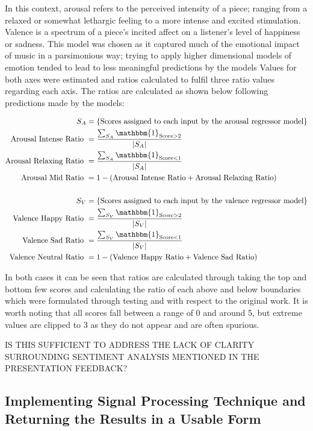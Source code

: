 \documentclass[12pt,]{article}
\begin{document}
In this context, arousal refers to the perceived intensity of a piece;
ranging from a relaxed or somewhat lethargic feeling to a more intense
and excited stimulation. Valence is a spectrum of a piece's incited
affect on a listener's level of happiness or sadness. This model was
chosen as it captured much of the emotional impact of music in a
parsimonious way; trying to apply higher dimensional models of emotion
tended to lead to less meaningful predictions by the models Values for
both axes were estimated and ratios calculated to fulfil three ratio
values regarding each axis. The ratios are calculated as shown below
following predictions made by the models:

\[\begin{aligned}
S_A &= \{\text{Scores assigned to each input by the arousal regressor model}\} \\
\text{Arousal Intense Ratio } &= \frac{\sum_{S_A} \mathbbm{1}_{\text{Score}> 2}}{|S_A|} \\
\text{Arousal Relaxing Ratio } &= \frac{\sum_{S_A} \mathbbm{1}_{\text{Score}< 1}}{|S_A|} \\
\text{Arousal Mid Ratio } &= 1 - (\text{Arousal Intense Ratio} + \text{Arousal Relaxing Ratio}) \\ \\
S_V &= \{\text{Scores assigned to each input by the valence regressor model}\} \\
\text{Valence Happy Ratio } &= \frac{\sum_{S_V} \mathbbm{1}_{\text{Score}> 2}}{|S_V|} \\
\text{Valence Sad Ratio } &= \frac{\sum_{S_V} \mathbbm{1}_{\text{Score}< 1}}{|S_V|} \\
\text{Valence Neutral Ratio } &= 1 - (\text{Valence Happy Ratio} + \text{Valence Sad Ratio}) \\
\end{aligned}\]

In both cases it can be seen that ratios are calculated through taking
the top and bottom few scores and calculating the ratio of each above
and below boundaries which were formulated through testing and with
respect to the original work. It is worth noting that all scores fall
between a range of 0 and around 5, but extreme values are clipped to 3
as they do not appear and are often spurious.

IS THIS SUFFICIENT TO ADDRESS THE LACK OF CLARITY SURROUNDING SENTIMENT
ANALYSIS MENTIONED IN THE PRESENTATION FEEDBACK?

\hypertarget{implementing-signal-processing-technique-and-returning-the-results-in-a-usable-form}{%
\subsection{Implementing Signal Processing Technique and Returning the
Results in a Usable
Form}\label{implementing-signal-processing-technique-and-returning-the-results-in-a-usable-form}}
\end{document}
